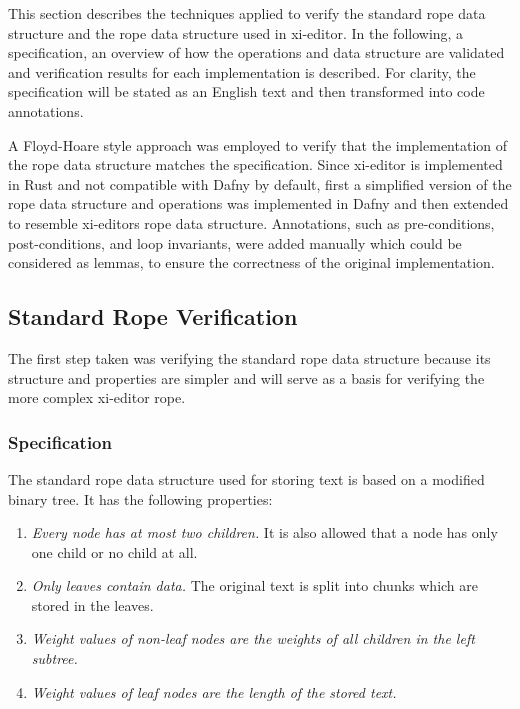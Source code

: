 This section describes the techniques applied to verify the standard rope data structure and the rope data structure used in xi-editor.
In the following, a specification, an overview of how the operations and data structure are validated and verification results for each implementation is described.
For clarity, the specification will be stated as an English text and then transformed into code annotations.

A Floyd-Hoare style approach was employed to verify that the implementation of the rope data structure matches the specification.
Since xi-editor is implemented in Rust and not compatible with Dafny by default, first a simplified version of the rope data structure and operations was implemented in Dafny and then extended to resemble xi-editors rope data structure.
Annotations, such as pre-conditions, post-conditions, and loop invariants, were added manually which could be considered as lemmas, to ensure the correctness of the original implementation.

\subsection{Standard Rope Verification}

The first step taken was verifying the standard rope data structure because its structure and properties are simpler and will serve as a basis for verifying the more complex xi-editor rope.

\subsubsection{Specification}

The standard rope data structure used for storing text is based on a modified binary tree.
It has the following properties:

\begin{enumerate}
  \item \textit{Every node has at most two children.} It is also allowed that a node has only one child or no child at all.
  \item \textit{Only leaves contain data.} The original text is split into chunks which are stored in the leaves.
  \item \textit{Weight values of non-leaf nodes are the weights of all children in the left subtree.}
  \item \textit{Weight values of leaf nodes are the length of the stored text.}
\end{enumerate}

